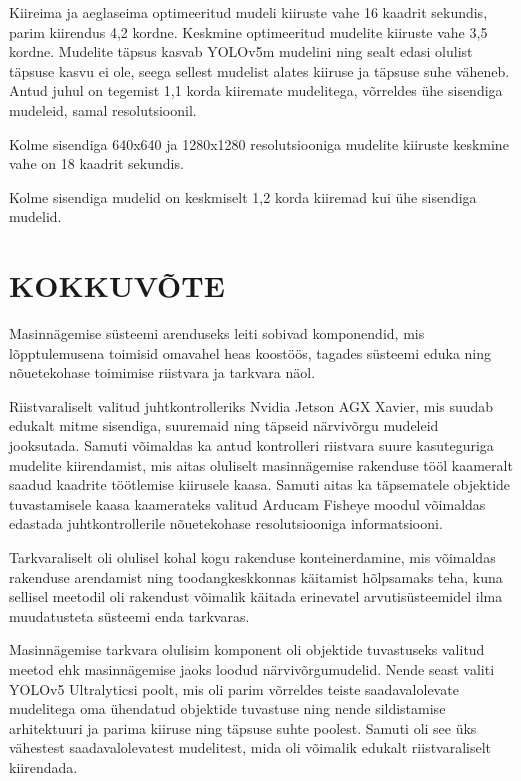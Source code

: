 \documentclass[12pt,a4paper]{report}
\begin{document}
Kiireima ja aeglaseima optimeeritud mudeli kiiruste vahe 16 kaadrit sekundis, parim kiirendus 4,2 kordne. Keskmine optimeeritud mudelite kiiruste vahe 3,5 kordne. Mudelite täpsus kasvab YOLOv5m mudelini ning sealt edasi olulist täpsuse kasvu ei ole, seega sellest mudelist alates kiiruse ja täpsuse suhe väheneb. Antud juhul on tegemist 1,1 korda kiiremate mudelitega, võrreldes ühe sisendiga mudeleid, samal resolutsioonil.

Kolme sisendiga 640x640 ja 1280x1280 resolutsiooniga mudelite kiiruste keskmine vahe on 18 kaadrit sekundis.

Kolme sisendiga mudelid on keskmiselt 1,2 korda kiiremad kui ühe sisendiga mudelid.

\section*{KOKKUVÕTE}\label{kokkuvuxf5te}

Masinnägemise süsteemi arenduseks leiti sobivad komponendid, mis lõpptulemusena toimisid omavahel heas koostöös, tagades süsteemi eduka ning nõuetekohase toimimise riistvara ja tarkvara näol.

Riistvaraliselt valitud juhtkontrolleriks Nvidia Jetson AGX Xavier, mis suudab edukalt mitme sisendiga, suuremaid ning täpseid närvivõrgu mudeleid jooksutada. Samuti võimaldas ka antud kontrolleri riistvara suure kasuteguriga mudelite kiirendamist, mis aitas oluliselt masinnägemise rakenduse tööl kaameralt saadud kaadrite töötlemise kiirusele kaasa. Samuti aitas ka täpsematele objektide tuvastamisele kaasa kaamerateks valitud Arducam Fisheye moodul võimaldas edastada juhtkontrollerile nõuetekohase resolutsiooniga informatsiooni.

Tarkvaraliselt oli olulisel kohal kogu rakenduse konteinerdamine, mis võimaldas rakenduse arendamist ning toodangkeskkonnas käitamist hõlpsamaks teha, kuna sellisel meetodil oli rakendust võimalik käitada erinevatel arvutisüsteemidel ilma muudatusteta süsteemi enda tarkvaras.

Masinnägemise tarkvara olulisim komponent oli objektide tuvastuseks valitud meetod ehk masinnägemise jaoks loodud närvivõrgumudelid. Nende seast valiti YOLOv5 Ultralyticsi poolt, mis oli parim võrreldes teiste saadavalolevate mudelitega oma ühendatud objektide tuvastuse ning nende sildistamise arhitektuuri ja parima kiiruse ning täpsuse suhte poolest. Samuti oli see üks vähestest saadavalolevatest mudelitest, mida oli võimalik edukalt riistvaraliselt kiirendada.
\end{document}
